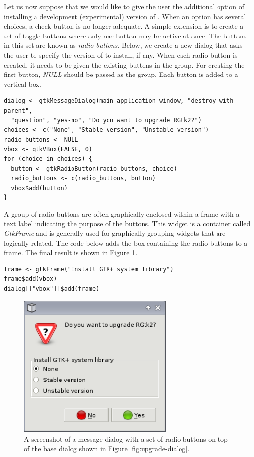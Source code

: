 \documentclass[article]{jss}
\begin{document}
Let us now suppose that we would like to give the user the additional option of
installing a development (experimental) version of .
When an option has several choices, a check button is no longer adequate. A
simple extension is to create a set of toggle buttons where only one button
may be active at once. The buttons in this set are known as \emph{radio buttons}.
Below, we create a new dialog that asks the user to specify the version of 
to install, if any. When each radio button is created, it needs to be given the existing buttons
in the group. For creating the first button, \emph{NULL} should be passed as the group.
Each button is added to a vertical box. 
\begin{verbatim}
dialog <- gtkMessageDialog(main_application_window, "destroy-with-parent", 
  "question", "yes-no", "Do you want to upgrade RGtk2?")
choices <- c("None", "Stable version", "Unstable version")
radio_buttons <- NULL
vbox <- gtkVBox(FALSE, 0)
for (choice in choices) {
  button <- gtkRadioButton(radio_buttons, choice)
  radio_buttons <- c(radio_buttons, button)
  vbox$add(button)
}
\end{verbatim}
A group of radio buttons are often graphically enclosed within a frame with
a text label indicating the purpose of the buttons. This widget is a container 
called \emph{GtkFrame} and is generally used for graphically grouping widgets that are
logically related. The code below adds the box containing the radio buttons
to a frame.
The final result is shown in Figure \ref{fig:radio-dialog}.
\begin{verbatim}
frame <- gtkFrame("Install GTK+ system library")
frame$add(vbox)
dialog[["vbox"]]$add(frame)
\end{verbatim}

\begin{figure}
\begin{center}
\includegraphics[width=3in]{radio-dialog.png}
\caption{\label{fig:radio-dialog}A screenshot of a message dialog with a set of
radio buttons on top of the base dialog shown in Figure \ref{fig:upgrade-dialog}.}
\end{center}
\end{figure}
\end{document}
